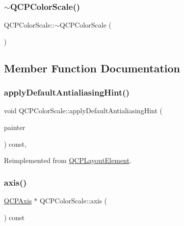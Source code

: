 \subsubsection{\texorpdfstring{$\sim$QCPColorScale()}{~QCPColorScale()}}
{\footnotesize\ttfamily Q\+C\+P\+Color\+Scale\+::$\sim$\+Q\+C\+P\+Color\+Scale (\begin{DoxyParamCaption}{ }\end{DoxyParamCaption})\hspace{0.3cm}{\ttfamily [virtual]}}



\subsection{Member Function Documentation}
\mbox{\label{class_q_c_p_color_scale_af1b24d24a70f25b65d29f09e413390a8}} 
\subsubsection{\texorpdfstring{applyDefaultAntialiasingHint()}{applyDefaultAntialiasingHint()}}
{\footnotesize\ttfamily void Q\+C\+P\+Color\+Scale\+::apply\+Default\+Antialiasing\+Hint (\begin{DoxyParamCaption}\item[{\mbox{\hyperlink{class_q_c_p_painter}{Q\+C\+P\+Painter}} $\ast$}]{painter }\end{DoxyParamCaption}) const\hspace{0.3cm}{\ttfamily [protected]}, {\ttfamily [virtual]}}



Reimplemented from \mbox{\hyperlink{class_q_c_p_layout_element_a0a8f18141bcf46cf40ad4c13324ff346}{Q\+C\+P\+Layout\+Element}}.

\mbox{\label{class_q_c_p_color_scale_a39bdbdb3b212602a5a57f9f3ea444190}} 
\subsubsection{\texorpdfstring{axis()}{axis()}}
{\footnotesize\ttfamily \mbox{\hyperlink{class_q_c_p_axis}{Q\+C\+P\+Axis}} $\ast$ Q\+C\+P\+Color\+Scale\+::axis (\begin{DoxyParamCaption}{ }\end{DoxyParamCaption}) const\hspace{0.3cm}{\ttfamily [inline]}}

